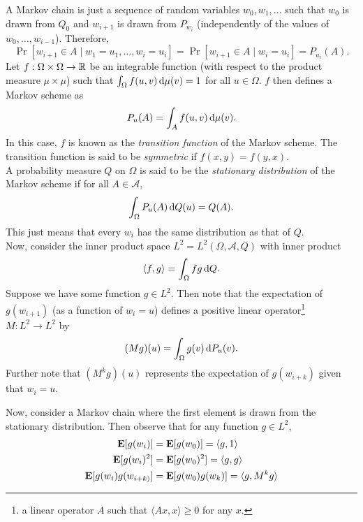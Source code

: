A Markov chain is just a sequence of random variables $w_0,w_1,\ldots$ such that $w_0$ is drawn from $Q_0$ and $w_{i+1}$ is drawn from $P_{w_i}$ (independently of the values of $w_0,\ldots,w_{i-1}$). Therefore,
\[ \Pr[w_{i+1}\in A \mid w_1=u_1,\ldots,w_i=u_i] = \Pr[w_{i+1}\in A\mid w_i=u_i] = P_{u_i}(A). \]
Let $f:\Omega\times\Omega\to\mathbb{R}$ be an integrable function (with respect to the product measure $\mu\times\mu$) such that $\int_\Omega f(u,v)\operatorname{d}\!{\mu}(v)=1$ for all $u\in\Omega$. $f$ then defines a Markov scheme as
\[ P_u(A) = \int_A f(u,v)\operatorname{d}\!{\mu}(v). \]
In this case, $f$ is known as the \textit{transition function} of the Markov scheme. The transition function is said to be \textit{symmetric} if $f(x,y)=f(y,x)$.\\

A probability measure $Q$ on $\Omega$ is said to be the \textit{stationary distribution} of the Markov scheme if for all $A\in\mathcal{A}$,
\[ \int_{\Omega}P_u(A)\operatorname{d}\!{Q}(u) = Q(A). \]
This just means that every $w_i$ has the same distribution as that of $Q$.\\

Now, consider the inner product space $L^2 = L^2 (\Omega,\mathcal{A},Q)$ with inner product
\[ \langle f,g\rangle = \int_\Omega f g\operatorname{d}\!{Q}. \]
Suppose we have some function $g\in L^2$. Then note that the expectation of $g(w_{i+1})$ (as a function of $w_i = u$) defines a positive linear operator\footnote{a linear operator $A$ such that $\langle Ax,x\rangle\geq 0$ for any $x$.} $M:L^2\to L^2$ by
\[ (Mg)(u) = \int_\Omega g(v)\operatorname{d}\!{P_u}(v). \]
Further note that $(M^k g)(u)$ represents the expectation of $g(w_{i+k})$ given that $w_i=u$.

Now, consider a Markov chain where the first element is drawn from the stationary distribution. Then observe that for any function $g\in L^2$,
\begin{align*}
    \textbf{E}[g(w_i)] &= \textbf{E}[g(w_0)] = \langle g,1\rangle \\
    \textbf{E}[g(w_i)^2] &= \textbf{E}[g(w_0)^2] = \langle g,g\rangle \\
    \textbf{E}[g(w_i)g(w_{i+k)}] &= \textbf{E}[g(w_0)g(w_k)] = \langle g,M^k g\rangle
\end{align*}

